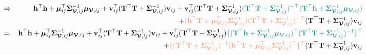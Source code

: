 \documentclass[12pt]{article}
\newcommand{\0}{\mathbf{0}}
\begin{document}
\begin{eqnarray*}
& \Rightarrow & \mathbf{h}^{\top} \mathbf{h} + \boldsymbol{\mu}_{ij}^{\top} \boldsymbol{\Sigma}_{\boldsymbol{\mathcal{V}}, ij}^{-1} \boldsymbol{\mu}_{\boldsymbol{\mathcal{V}}, ij} + \mathbf{v}_{ij}^{\top} ( \mathbf{T}^{\top} \mathbf{T} + \boldsymbol{\Sigma}_{\boldsymbol{\mathcal{V}}, ij}^{-1} ) \mathbf{v}_{ij} + \mathbf{v}_{ij}^{\top} ( \mathbf{T}^{\top} \mathbf{T} + \boldsymbol{\Sigma}_{\boldsymbol{\mathcal{V}}, ij}^{-1} ) \textcolor{kaustgreen}{ ( \mathbf{T}^{\top} \mathbf{T} + \boldsymbol{\Sigma}_{\boldsymbol{\mathcal{V}}, ij}^{-1} )^{-\top} ( \mathbf{T}^{\top} \mathbf{h} + \boldsymbol{\Sigma}_{\boldsymbol{\mathcal{V}}, ij}^{-1}\boldsymbol{\mu}_{\boldsymbol{\mathcal{V}}, ij} ) } \\
&& + \textcolor{lightsalmon}{( \mathbf{h}^{\top} \mathbf{T} + \boldsymbol{\mu}_{\boldsymbol{\mathcal{V}}, ij}^{\top} \boldsymbol{\Sigma}_{\boldsymbol{\mathcal{V}}, ij}^{-1}) ( \mathbf{T}^{\top} \mathbf{T} + \boldsymbol{\Sigma}_{\boldsymbol{\mathcal{V}}, ij}^{-1} )^{-\top}} ( \mathbf{T}^{\top} \mathbf{T} + \boldsymbol{\Sigma}_{\boldsymbol{\mathcal{V}}, ij}^{-1} ) \mathbf{v}_{ij} \\
& = & \mathbf{h}^{\top} \mathbf{h} + \boldsymbol{\mu}_{ij}^{\top} \boldsymbol{\Sigma}_{\boldsymbol{\mathcal{V}}, ij}^{-1} \boldsymbol{\mu}_{\boldsymbol{\mathcal{V}}, ij} + \mathbf{v}_{ij}^{\top} ( \mathbf{T}^{\top} \mathbf{T} + \boldsymbol{\Sigma}_{\boldsymbol{\mathcal{V}}, ij}^{-1} ) \mathbf{v}_{ij} + \mathbf{v}_{ij}^{\top} ( \mathbf{T}^{\top} \mathbf{T} + \boldsymbol{\Sigma}_{\boldsymbol{\mathcal{V}}, ij}^{-1} ) \textcolor{kaustgreen}{\{ (\mathbf{T}^{\top} \mathbf{h} + \boldsymbol{\Sigma}_{\boldsymbol{\mathcal{V}}, ij}^{-1}\boldsymbol{\mu}_{\boldsymbol{\mathcal{V}}, ij} )^{\top} ( \mathbf{T}^{\top} \mathbf{T} + \boldsymbol{\Sigma}_{\boldsymbol{\mathcal{V}}, ij}^{-1} )^{-1} \}^{\top}} \\
&& + \textcolor{lightsalmon}{\{ ( \mathbf{T}^{\top} \mathbf{T} + \boldsymbol{\Sigma}_{\boldsymbol{\mathcal{V}}, ij}^{-1} )^{-1} ( \mathbf{h}^{\top} \mathbf{T} + \boldsymbol{\mu}_{\boldsymbol{\mathcal{V}}, ij}^{\top} \boldsymbol{\Sigma}_{\boldsymbol{\mathcal{V}}, ij}^{-1})^{\top} \}^{\top}} ( \mathbf{T}^{\top} \mathbf{T} + \boldsymbol{\Sigma}_{\boldsymbol{\mathcal{V}}, ij}^{-1} ) \mathbf{v}_{ij} 
\end{eqnarray*}
\end{document}
